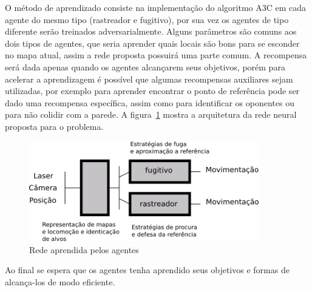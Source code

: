 \documentclass[a4paper, 12pt]{article}
\begin{document}
	O método de aprendizado consiste na implementação do algoritmo A3C em cada
	agente do mesmo tipo (rastreador e fugitivo), por sua vez os agentes de tipo
	diferente serão treinados adversarialmente. Alguns parâmetros são comuns aos
	dois tipos de agentes, que seria aprender quais locais são bons para se
	esconder no mapa atual, assim a rede proposta possuirá uma parte comum. A
	recompensa será dada apenas quando os agentes alcançarem seus objetivos,
	porém para acelerar a aprendizagem é possível que algumas recompensas
	auxiliares sejam utilizadas, por exemplo para aprender encontrar o ponto de
	referência pode ser dado uma recompensa específica, assim como para
	identificar os oponentes ou para não colidir com a parede. A
	figura~\ref{fig1} mostra a arquitetura da rede neural proposta para o
	problema.

	\begin{figure}[H]
		\centering
		\includegraphics[width=10cm]{fig/rede.png}
		\caption{Rede aprendida pelos agentes}\label{fig1}
	\end{figure}

	Ao final se espera que os agentes tenha aprendido seus objetivos e formas de
	alcança-los de modo eficiente.
\end{document}
